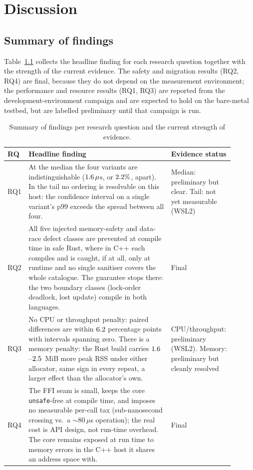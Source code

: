 \documentclass[english,twoside,openright,a4paper,censored,csm,software-track-2020]{HYthesisML}
\begin{document}
\chapter{Discussion\label{chapter:discussion}}

\section{Summary of findings}
Table~\ref{tab:findings} collects the headline finding for each research question together
with the strength of the current evidence. The safety and migration results (RQ2, RQ4) are
final, because they do not depend on the measurement environment; the performance and resource
results (RQ1, RQ3) are reported from the development-environment campaign and are expected to
hold on the bare-metal testbed, but are labelled preliminary until that campaign is run.

\begin{table}
\centering
\caption{Summary of findings per research question and the current strength of evidence.
\label{tab:findings}}
\renewcommand{\arraystretch}{1.25}
\begin{tabular}{@{}p{0.06\linewidth} p{0.62\linewidth} p{0.22\linewidth}@{}}
\hline\hline
RQ & Headline finding & Evidence status \\
\hline
RQ1 & At the median the four variants are indistinguishable ($1.6\,\mu$s, or
$2.2\%$, apart). In the tail no ordering is resolvable on this host: the confidence
interval on a single variant's p99 exceeds the spread between all four. & Median: preliminary
but clear. Tail: not yet measurable (WSL2) \\
RQ2 & All five injected memory-safety and data-race defect classes are prevented at compile
time in safe Rust, where in C++ each compiles and is caught, if at all, only at runtime and no
single sanitiser covers the whole catalogue. The guarantee stops there: the two boundary
classes (lock-order deadlock, lost update) compile in both languages. & Final \\
RQ3 & No CPU or throughput penalty: paired differences are within
$6.2$ percentage points with intervals spanning zero. There is a memory penalty: the
Rust build carries $1.6$--$2.5$~MiB more peak RSS under either allocator,
same sign in every repeat, a larger effect than the allocator's own. & CPU/throughput:
preliminary (WSL2). Memory: preliminary but cleanly resolved \\
RQ4 & The FFI seam is small, keeps the core \texttt{unsafe}-free at compile time, and imposes
no measurable per-call tax (sub-nanosecond crossing vs.\ a $\sim$$80\,\mu$s operation); the
real cost is API design, not run-time overhead. The core remains exposed at run time to memory
errors in the C++ host it shares an address space with. & Final \\
\hline
\end{tabular}
\end{table}
\end{document}
